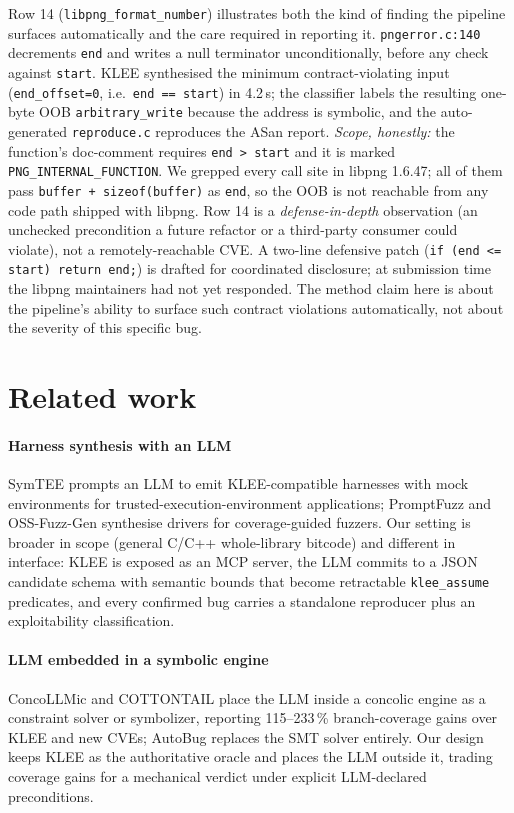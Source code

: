 \documentclass[3p,times,procedia]{elsarticle}
\begin{document}
Row 14 (\texttt{libpng\_format\_number}) illustrates both the kind of finding the pipeline surfaces automatically and the care required in reporting it. \texttt{pngerror.c:140} decrements \texttt{end} and writes a null terminator unconditionally, before any check against \texttt{start}. KLEE synthesised the minimum contract-violating input (\texttt{end\_offset=0}, i.e.\ \texttt{end == start}) in 4.2\,s; the classifier labels the resulting one-byte OOB \texttt{arbitrary\_write} because the address is symbolic, and the auto-generated \texttt{reproduce.c} reproduces the ASan report. \emph{Scope, honestly:} the function's doc-comment requires \texttt{end > start} and it is marked \texttt{PNG\_INTERNAL\_FUNCTION}. We grepped every call site in libpng 1.6.47; all of them pass \texttt{buffer + sizeof(buffer)} as \texttt{end}, so the OOB is not reachable from any code path shipped with libpng. Row 14 is a \emph{defense-in-depth} observation (an unchecked precondition a future refactor or a third-party consumer could violate), not a remotely-reachable CVE. A two-line defensive patch (\texttt{if (end <= start) return end;}) is drafted for coordinated disclosure; at submission time the libpng maintainers had not yet responded. The method claim here is about the pipeline's ability to surface such contract violations automatically, not about the severity of this specific bug.

\section{Related work}
\label{sec:related}

\paragraph{Harness synthesis with an LLM} SymTEE \cite{symtee} prompts an LLM to emit KLEE-compatible harnesses with mock environments for trusted-execution-environment applications; PromptFuzz \cite{promptfuzz} and OSS-Fuzz-Gen \cite{ossfuzzgen} synthesise drivers for coverage-guided fuzzers. Our setting is broader in scope (general C/C++ whole-library bitcode) and different in interface: KLEE is exposed as an MCP server, the LLM commits to a JSON candidate schema with semantic bounds that become retractable \texttt{klee\_assume} predicates, and every confirmed bug carries a standalone reproducer plus an exploitability classification.

\paragraph{LLM embedded in a symbolic engine} ConcoLLMic \cite{concollmic} and COTTONTAIL \cite{cottontail} place the LLM inside a concolic engine as a constraint solver or symbolizer, reporting 115--233\,\% branch-coverage gains over KLEE and new CVEs; AutoBug \cite{autobug} replaces the SMT solver entirely. Our design keeps KLEE as the authoritative oracle and places the LLM outside it, trading coverage gains for a mechanical verdict under explicit LLM-declared preconditions.
\end{document}

